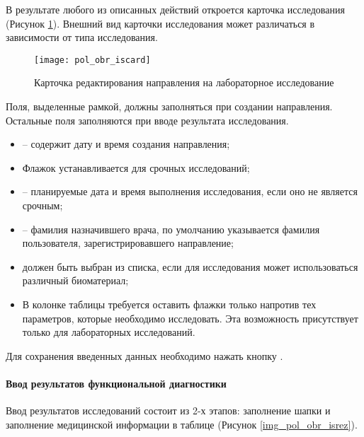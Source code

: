 В результате любого из описанных действий откроется карточка исследования (Рисунок \ref{img_pol_obr_iscard}). Внешний вид карточки исследования может различаться в зависимости от типа исследования.

 \begin{figure}[ht]\centering
   \texttt{[image: pol\_obr\_iscard]}
   \caption{Карточка редактирования направления на лабораторное исследование}
   \label{img_pol_obr_iscard}
 \end{figure} 
 
Поля, выделенные рамкой, должны заполняться при создании направления. Остальные поля заполняются при вводе результата исследования.
\begin{itemize}
 \item {} – содержит дату и время создания направления;
 \item Флажок  устанавливается для срочных исследований;
 \item {} – планируемые дата и время выполнения исследования, если оно не является срочным;
 \item {} – фамилия назначившего врача, по умолчанию указывается фамилия пользователя, зарегистрировавшего направление;
 \item {} должен быть выбран из списка, если для исследования может использоваться различный биоматериал;
 \item В колонке  таблицы требуется оставить флажки только напротив тех параметров, которые необходимо исследовать. Эта возможность присутствует только для лабораторных исследований.
\end{itemize}
 
Для сохранения введенных данных необходимо нажать кнопку .

\paragraph{Ввод результатов функциональной диагностики} \label{pol_obr_isrez}

Ввод результатов исследований состоит из 2-х этапов: заполнение шапки и заполнение медицинской информации в таблице (Рисунок \ref{img_pol_obr_isrez}).

